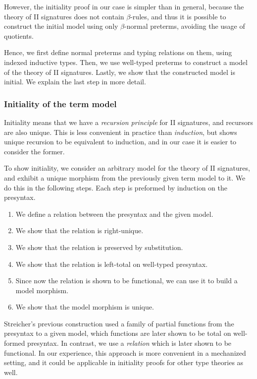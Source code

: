 However, the initiality proof in our case is simpler than in general, because
the theory of II signatures does not contain $\beta$-rules, and thus it is
possible to construct the initial model using only $\beta$-normal preterms,
avoiding the usage of quotients.

Hence, we first define normal preterms and typing relations on them, using indexed
inductive types. Then, we use well-typed preterms to construct a model of the theory
of II signatures. Lastly, we show that the constructed model is initial. We explain
the last step in more detail.

\subsubsection*{Initiality of the term model}

Initiality means that we have a \emph{recursion principle} for II signatures,
and recursors are also unique. This is less convenient in practice than
\emph{induction}, but \cite{qiit} shows unique recursion to be equivalent to
induction, and in our case it is easier to consider the former.

To show initiality, we consider an arbitrary model for the theory of II
signatures, and exhibit a unique morphism from the previously given term model
to it. We do this in the following steps. Each step is preformed by induction on
the presyntax.

\begin{enumerate}
  \item We define a relation between the presyntax and the given model.
  \item We show that the relation is right-unique.
  \item We show that the relation is preserved by substitution.
  \item We show that the relation is left-total on well-typed presyntax.
  \item Since now the relation is shown to be functional, we can use it to
        build a model morphism.
  \item We show that the model morphism is unique.
\end{enumerate}

Streicher's previous construction \cite{streicher2012semantics} used a family of
partial functions from the presyntax to a given model, which functions are later
shown to be total on well-formed presyntax. In contrast, we use a
\emph{relation} which is later shown to be functional. In our experience, this
approach is more convenient in a mechanized setting, and it could be applicable
in initiality proofs for other type theories as well.

